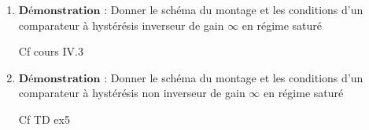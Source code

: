 \begin{enumerate}[label=\arabic{enumi} - , left=0pt, itemsep=1em]
    \item  $\textbf{Démonstration :}$ Donner le schéma du montage et les conditions d'un comparateur à hystérésis inverseur de gain  $\infty$ en régime saturé \par
    \begin{solution}
        Cf cours IV.3
    \end{solution}

    \item  $\textbf{Démonstration :}$ Donner le schéma du montage et les conditions d'un comparateur à hystérésis non inverseur de gain  $\infty$ en régime saturé \par
    \begin{solution}
        Cf TD ex5
    \end{solution}
    
\end{enumerate}

